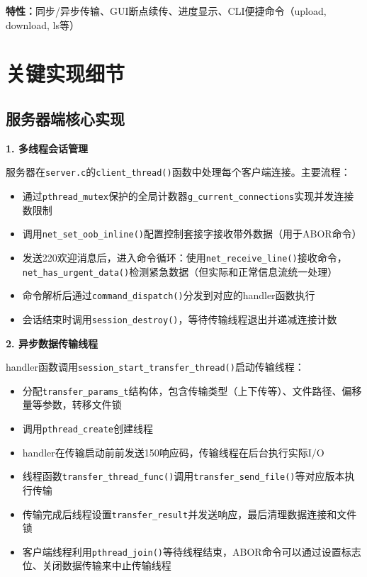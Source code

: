 \documentclass[11pt,a4paper]{article}
\begin{document}
\textbf{特性：}同步/异步传输、GUI断点续传、进度显示、CLI便捷命令（upload, download, ls等）

\section{关键实现细节}

\subsection{服务器端核心实现}

\textbf{1. 多线程会话管理}

服务器在\texttt{server.c}的\texttt{client\_thread()}函数中处理每个客户端连接。主要流程：
\begin{itemize}[itemsep=0pt]
    \item 通过\texttt{pthread\_mutex}保护的全局计数器\texttt{g\_current\_connections}实现并发连接数限制
    \item 调用\texttt{net\_set\_oob\_inline()}配置控制套接字接收带外数据（用于ABOR命令）
    \item 发送220欢迎消息后，进入命令循环：使用\texttt{net\_receive\_line()}接收命令，\texttt{net\_has\_urgent\_data()}检测紧急数据（但实际和正常信息流统一处理）
    \item 命令解析后通过\texttt{command\_dispatch()}分发到对应的handler函数执行
    \item 会话结束时调用\texttt{session\_destroy()}，等待传输线程退出并递减连接计数
\end{itemize}

\textbf{2. 异步数据传输线程}

handler函数调用\texttt{session\_start\_transfer\_thread()}启动传输线程：
\begin{itemize}[itemsep=0pt]
    \item 分配\texttt{transfer\_params\_t}结构体，包含传输类型（上下传等）、文件路径、偏移量等参数，转移文件锁
    \item 调用\texttt{pthread\_create}创建线程
    \item handler在传输启动前前发送150响应码，传输线程在后台执行实际I/O
    \item 线程函数\texttt{transfer\_thread\_func()}调用\texttt{transfer\_send\_file()}等对应版本执行传输
    \item 传输完成后线程设置\texttt{transfer\_result}并发送响应，最后清理数据连接和文件锁
    \item 客户端线程利用\texttt{pthread\_join()}等待线程结束，ABOR命令可以通过设置标志位、关闭数据传输来中止传输线程
\end{itemize}
\end{document}
